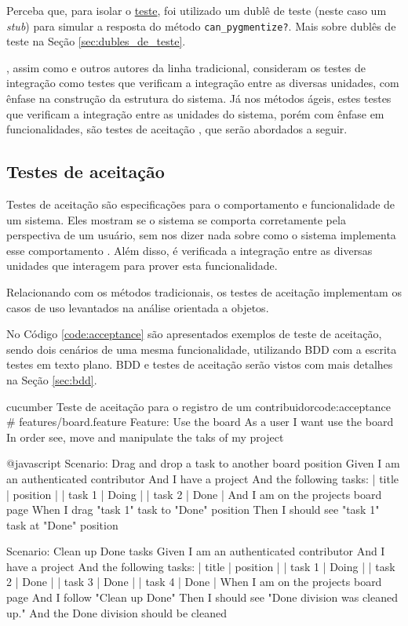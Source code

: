Perceba que, para isolar o \hyperref[code:integration_spec]{teste}, foi utilizado um dublê de teste (neste caso um \textit{stub}) para simular a resposta do método \texttt{can\_pygmentize?}. Mais sobre dublês de teste na Seção \ref{sec:dubles_de_teste}.

, assim como  e outros autores da linha tradicional, consideram os testes de integração como testes que verificam a integração entre as diversas unidades, com ênfase na construção da estrutura do sistema. Já nos métodos ágeis, estes testes que verificam a integração entre as unidades do sistema, porém com ênfase em funcionalidades, são testes de aceitação \cite{XPTeles}, que serão abordados a seguir.


\subsection{Testes de aceitação}
\label{ssub:testes_de_aceitacao}

Testes de aceitação são especificações para o comportamento e funcionalidade de um sistema. Eles mostram se o sistema se comporta corretamente pela perspectiva de um usuário, sem nos dizer nada sobre como o sistema implementa esse comportamento \cite{TestDrivenKoskela}. Além disso, é verificada a integração entre as diversas unidades que interagem para prover esta funcionalidade.

Relacionando com os métodos tradicionais, os testes de aceitação implementam os casos de uso levantados na análise orientada a objetos.

No Código \ref{code:acceptance} são apresentados exemplos de teste de aceitação, sendo dois cenários de uma mesma funcionalidade, utilizando BDD com a escrita testes em texto plano. BDD e testes de aceitação serão vistos com mais detalhes na Seção \ref{sec:bdd}.

\begin{mycode}{cucumber}%
{Teste de aceitação para o registro de um contribuidor}{code:acceptance}
# features/board.feature
Feature: Use the board
  As a user
  I want use the board
  In order see, move and manipulate the taks of my project

  @javascript
  Scenario: Drag and drop a task to another board position
    Given I am an authenticated contributor
    And I have a project
    And the following tasks:
      | title  | position |
      | task 1 | Doing    |
      | task 2 | Done     |
    And I am on the projects board page
    When I drag "task 1" task to "Done" position
    Then I should see "task 1" task at "Done" position

  Scenario: Clean up Done tasks
    Given I am an authenticated contributor
    And I have a project
    And the following tasks:
      | title  | position |
      | task 1 | Doing    |
      | task 2 | Done     |
      | task 3 | Done     |
      | task 4 | Done     |
    When I am on the projects board page
    And I follow "Clean up Done"
    Then I should see "Done division was cleaned up."
    And the Done division should be cleaned
\end{mycode}


